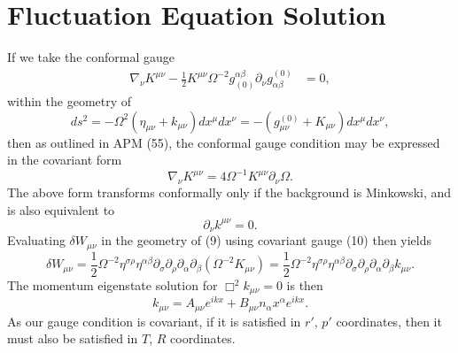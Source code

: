 \documentclass[10pt,letterpaper]{article}
\begin{document}
\section*{Fluctuation Equation Solution}
If we take the conformal gauge 
\begin{align}
\nabla_\nu K^{\mu\nu} - \frac12 K^{\mu\nu} \Omega^{-2}g_{(0)}^{\alpha\beta}\partial_\nu g^{(0)}_{\alpha\beta} &= 0,
\end{align}
within the geometry of
\begin{equation}
ds^2 = -\Omega^2( \eta_{\mu\nu}+k_{\mu\nu})dx^\mu dx^\nu = -(g_{\mu\nu}^{(0)} +  K_{\mu\nu})dx^\mu dx^\nu,
\end{equation}
then as outlined in APM (55), the conformal gauge condition may be expressed in the covariant form
\begin{equation}
\nabla_{\nu} K^{\mu\nu} = 4\Omega^{-1}K^{\mu\nu}\partial_\nu \Omega.
\end{equation}
The above form transforms conformally only if the background is Minkowski, and is also equivalent to
\begin{equation}
\partial_\nu k^{\mu\nu} =0.
\end{equation}
Evaluating $\delta W_{\mu\nu}$ in the geometry of (9) using covariant gauge (10) then yields
\begin{equation}
\delta W_{\mu\nu} = \frac12 \Omega^{-2} \eta^{\sigma\rho}\eta^{\alpha\beta} \partial_\sigma\partial_\rho \partial_\alpha\partial_\beta(\Omega^{-2}K_{\mu\nu}) = \frac12 \Omega^{-2} \eta^{\sigma\rho}\eta^{\alpha\beta} \partial_\sigma\partial_\rho \partial_\alpha\partial_\beta k_{\mu\nu}.
\end{equation}
The momentum eigenstate solution for $\Box^2 k_{\mu\nu}=0$ is then
\begin{equation} 
k_{\mu\nu} = A_{\mu\nu} e^{ikx} + B_{\mu\nu} n_\alpha x^\alpha e^{ikx}.
\end{equation}
As our gauge condition is covariant, if it is satisfied in $r'$, $p'$ coordinates, then it must also be satisfied in $T$, $R$ coordinates. 
\end{document}
